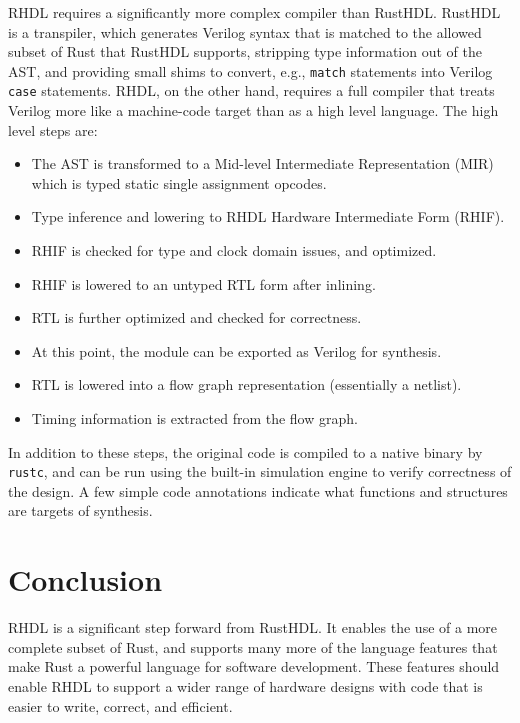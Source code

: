 \documentclass[sigplan,screen,sigconf]{acmart}
\begin{document}
RHDL requires a significantly more complex compiler than RustHDL.  RustHDL \cite{b13} is a transpiler, which generates Verilog syntax that is matched to the allowed subset of Rust that RustHDL supports, stripping type information out of the AST, and providing small shims to convert, e.g., \verb|match| statements into Verilog \verb|case| statements.  RHDL, on the other hand, requires a full compiler that treats Verilog more like a machine-code target than as a high level language.  The high level steps are:
\begin{itemize}
\item The AST is transformed to a Mid-level Intermediate Representation (MIR) which is typed static single assignment opcodes.
\item Type inference and lowering to RHDL Hardware Intermediate Form (RHIF).
\item RHIF is checked for type and clock domain issues, and optimized.
\item RHIF is lowered to an untyped RTL form after inlining.
\item RTL is further optimized and checked for correctness.
\item At this point, the module can be exported as Verilog for synthesis.
\item RTL is lowered into a flow graph representation (essentially a netlist).
\item Timing information is extracted from the flow graph.
\end{itemize}
In addition to these steps, the original code is compiled to a native binary by \verb|rustc|, and can be run using the built-in simulation engine to verify correctness of the design.  A few simple code annotations indicate what functions and structures are targets of synthesis.

\section{Conclusion}
RHDL is a significant step forward from RustHDL.  It enables the use of a more complete subset of Rust, and supports many more of the language features that make Rust a powerful language for software development.  These features should enable RHDL to support a wider range of hardware designs with code that is easier to write, correct, and efficient.

\newpage
\end{document}
